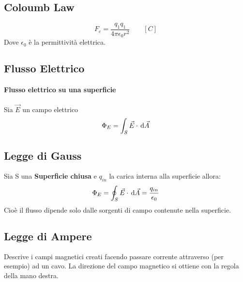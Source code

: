 \subsection{Coloumb Law}
\begin{equation}
	F_e = \frac{q_1 q_1}{4\pi \epsilon_0 r^2} \qquad[C] \tag{Forza di Coloumb}
\end{equation}
Dove $\epsilon_0$ è la permittività elettrica.

\subsection{Flusso Elettrico}
\paragraph{Flusso elettrico su una superficie}
Sia $\vec{E}$ un campo elettrico
\begin{equation}
	\Phi_E = \int_{S} \vec{E} \cdot \,\mathrm{d} \vec{A}
\end{equation}

\subsection{Legge di Gauss}
Sia S una \textbf{Superficie chiusa} e $q_{in}$ la carica interna alla superficie allora:
\begin{equation}
	\Phi_E = \oint_{S} \vec{E} \cdot \,\mathrm{d} \vec{A} = \frac{q_{in}}{\epsilon_0}
\end{equation}
Cioè il flusso dipende solo dalle sorgenti di campo contenute nella superficie.
\subsection{Legge di Ampere}
Descrive i campi magnetici creati facendo passare corrente attraverso (per esempio) ad un cavo. La direzione del campo magnetico si ottiene con la regola della mano destra.

